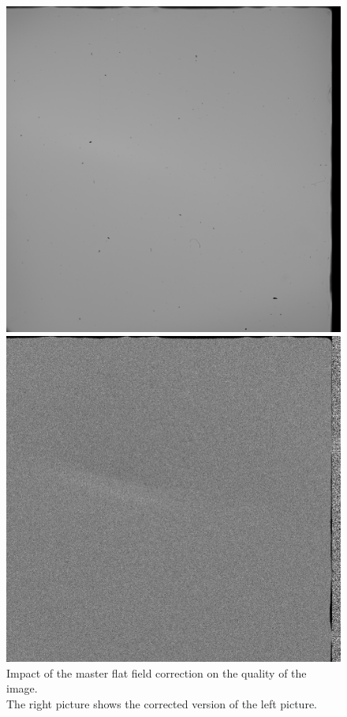 \begin{figure}[H]
	\hspace{0.05\textwidth}
	\begin{minipage}{0.4\textwidth}
		\includegraphics[width = \textwidth]{figures/Exposures/before}
	\end{minipage}
	\hspace{0.05\textwidth}
	\begin{minipage}{0.4\textwidth}
		\includegraphics[width = \textwidth]{figures/Exposures/correction}
	\end{minipage}
	\caption[Impact of the master flat field correction on the quality of the image]{Impact of the master flat field correction on the quality of the image.  \\ The right picture shows the corrected version of the left picture.}
	\label{fig:ffc}
\end{figure} 
